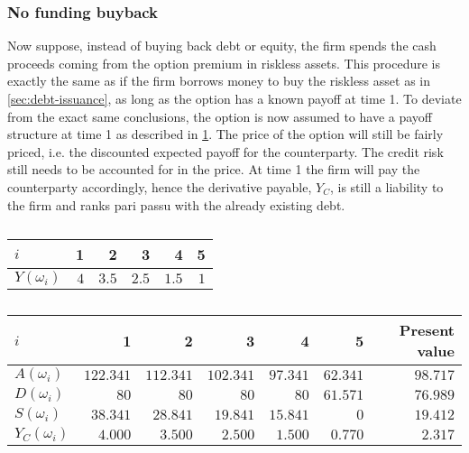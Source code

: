 \documentclass[../main.tex]{subfiles}
\begin{document}
        \subsubsection{No funding buyback}
            Now suppose, instead of buying back debt or equity, 
            the firm spends the cash proceeds coming from the option premium in riskless assets. 
            This procedure is exactly the same as if the firm borrows money to buy the riskless asset 
            as in \cref{sec:debt-issuance}, as long as the option has a known payoff at time 1. 
            To deviate from the exact same conclusions, the option is now assumed to have a payoff structure at time 1 
            as described in \cref{tbl:risky-option-payoff}. 
            The price of the option will still be fairly priced, i.e. the discounted expected payoff for the counterparty. 
            The credit risk still needs to be accounted for in the price. 
            At time 1 the firm will pay the counterparty accordingly, hence the derivative payable, $Y_C$, 
            is still a liability to the firm and ranks pari passu with the already existing debt.
            
            \begin{table}[h]
                \centering
                \begin{tabular}{l|rrrrr}
                    $i$ & 1 & 2 & 3 & 4 & 5 \\
                    \hline
                    $Y(\omega_{i})$ & $4$ & $3.5$ & $2.5$ & $1.5$ & $1$ \\
                \end{tabular}
                \caption{}
                \label{tbl:risky-option-payoff}
            \end{table}

            \begin{table}[h]
                \centering
                \begin{tabular}{l|rrrrr||r}
                    $i$ & 1 & 2 & 3 & 4 & 5 & Present value \\
                    \hline
                    $A(\omega_{i})$ & $122.341$ & $112.341$ & $102.341$ & $97.341$ & $62.341$ & $98.717$ \\
                    $D(\omega_{i})$ & $80$ & $80$ & $80$ & $80$ & $61.571$ & $76.989$ \\
                    $S(\omega_{i})$ & $38.341$ & $28.841$ & $19.841$ & $15.841$ & $0$ & $19.412$ \\
                    $Y_C(\omega_{i})$ & $4.000$ & $3.500$ & $2.500$ & $1.500$ & $0.770$ & $2.317$ \\
                \end{tabular}
                \caption{}
                \label{tbl:example-no-funding-buyback}
            \end{table}
\end{document}
